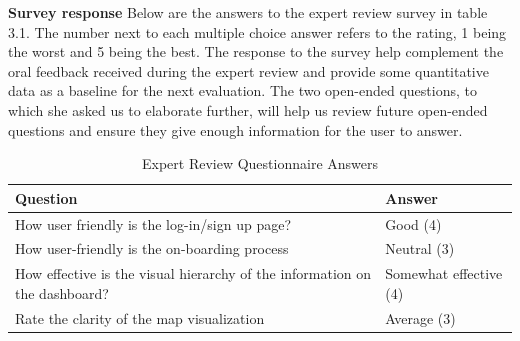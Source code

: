 \documentclass{report}
\begin{document}
\textbf{Survey response}
Below are the answers to the expert review survey in table 3.1. The number next to each multiple choice answer refers to the rating, 1 being the worst and 5 being the best. The response to the survey help complement the oral feedback received during the expert review and provide some quantitative data as a baseline for the next evaluation. The two open-ended questions, to which she asked us to elaborate further, will help us review future open-ended questions and ensure they give enough information for the user to answer.
\begin{table}[h!]
    \centering
    \caption{Expert Review Questionnaire Answers}
    \label{tab:table4}
    \begin{tabularx}{\textwidth}{|p{}|X|}
        \hline
        \textbf{Question}                                                                                                        & \textbf{Answer}                                                                                                                                                                                                       \\ \hline
        How user friendly is the log-in/sign up page?                                                                            & Good (4)                                                                                                                                                                                                              \\ \hline
        How user-friendly is the on-boarding process                                                                             & Neutral (3)                                                                                                                                                                                                           \\ \hline
        How effective is the visual hierarchy of the information on the dashboard?                                               & Somewhat effective (4)                                                                                                                                                                                                \\ \hline
        Rate the clarity of the map visualization                                                                                & Average (3)                                                                                                                                                                                                           \\ \hline

\end{tabularx}
\end{table}
\end{document}
